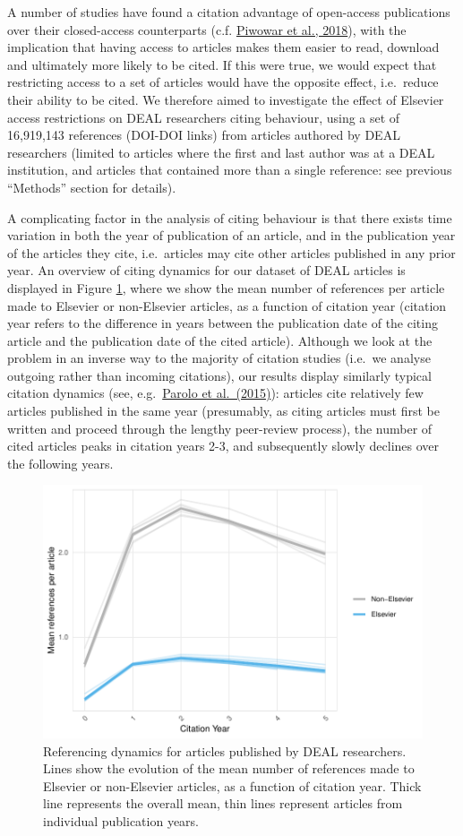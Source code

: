 \documentclass[
]{article}
\begin{document}
A number of studies have found a citation advantage of open-access publications over their closed-access counterparts (c.f. \href{https://doi.org/10.7717/peerj.4375}{Piwowar et al., 2018}), with the implication that having access to articles makes them easier to read, download and ultimately more likely to be cited. If this were true, we would expect that restricting access to a set of articles would have the opposite effect, i.e.~reduce their ability to be cited. We therefore aimed to investigate the effect of Elsevier access restrictions on DEAL researchers citing behaviour, using a set of 16,919,143 references (DOI-DOI links) from articles authored by DEAL researchers (limited to articles where the first and last author was at a DEAL institution, and articles that contained more than a single reference: see previous ``Methods'' section for details).

A complicating factor in the analysis of citing behaviour is that there exists time variation in both the year of publication of an article, and in the publication year of the articles they cite, i.e.~articles may cite other articles published in any prior year. An overview of citing dynamics for our dataset of DEAL articles is displayed in Figure \ref{fig:references-publisher-year-cityear}, where we show the mean number of references per article made to Elsevier or non-Elsevier articles, as a function of citation year (citation year refers to the difference in years between the publication date of the citing article and the publication date of the cited article). Although we look at the problem in an inverse way to the majority of citation studies (i.e.~we analyse outgoing rather than incoming citations), our results display similarly typical citation dynamics (see, e.g.~\href{https://doi.org/10.1016/j.joi.2015.07.006}{Parolo et al.~(2015)}): articles cite relatively few articles published in the same year (presumably, as citing articles must first be written and proceed through the lengthy peer-review process), the number of cited articles peaks in citation years 2-3, and subsequently slowly declines over the following years.

\begin{figure}

{\centering \includegraphics[width=0.4\linewidth]{analysis_files/figure-latex/references-publisher-year-cityear-1} 

}

\caption{Referencing dynamics for articles published by DEAL researchers. Lines show the evolution of the mean number of references made to Elsevier or non-Elsevier articles, as a function of citation year. Thick line represents the overall mean, thin lines represent articles from individual publication years.}\label{fig:references-publisher-year-cityear}
\end{figure}
\end{document}
